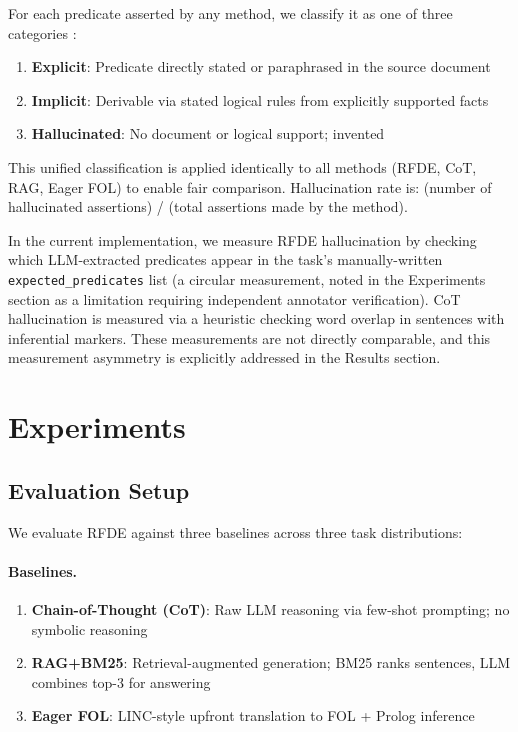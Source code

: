 \documentclass[11pt,letterpaper]{article}
\begin{document}
For each predicate asserted by any method, we classify it as one of three categories
\citep{Olausson2023}:

\begin{enumerate}
  \item \textbf{Explicit}: Predicate directly stated or paraphrased in the source document
  \item \textbf{Implicit}: Derivable via stated logical rules from explicitly supported facts
  \item \textbf{Hallucinated}: No document or logical support; invented
\end{enumerate}

This unified classification is applied identically to all methods (RFDE, CoT, RAG, Eager FOL)
to enable fair comparison. Hallucination rate is: (number of hallucinated assertions) / (total
assertions made by the method).

In the current implementation, we measure RFDE hallucination by checking which LLM-extracted
predicates appear in the task's manually-written \texttt{expected\_predicates} list (a
circular measurement, noted in the Experiments section as a limitation requiring independent
annotator verification). CoT hallucination is measured via a heuristic checking word overlap
in sentences with inferential markers. These measurements are not directly comparable, and
this measurement asymmetry is explicitly addressed in the Results section.

\section{Experiments}

\subsection{Evaluation Setup}

We evaluate RFDE against three baselines across three task distributions:

\paragraph{Baselines.}
\begin{enumerate}
  \item \textbf{Chain-of-Thought (CoT)}: Raw LLM reasoning via few-shot prompting; no symbolic
    reasoning
  \item \textbf{RAG+BM25}: Retrieval-augmented generation; BM25 ranks sentences, LLM combines
    top-3 for answering
  \item \textbf{Eager FOL}: LINC-style upfront translation to FOL + Prolog inference
\end{enumerate}
\end{document}
